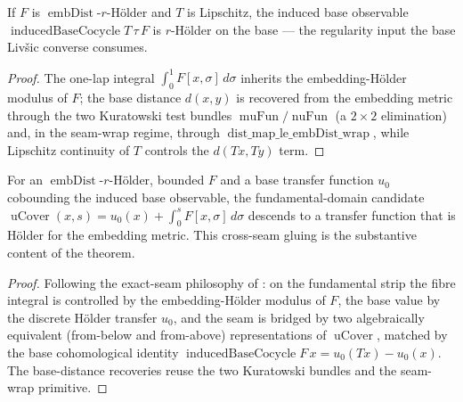 \begin{lemma}\label{holderWith_inducedBaseCocycle}
  \leanok
  If \(F\) is \(\operatorname{embDist}\)-\(r\)-Hölder and \(T\) is Lipschitz, the induced base
  observable \(\operatorname{inducedBaseCocycle} T\,\tau\,F\) is \(r\)-Hölder on the base --- the
  regularity input the base Livšic converse consumes.
\end{lemma}
\begin{proof}\leanok
  The one-lap integral \(\int_0^{1} F[x, \sigma]\,d\sigma\) inherits the embedding-Hölder modulus of
  \(F\); the base distance \(d(x, y)\) is recovered from the embedding metric through the two
  Kuratowski test bundles \(\operatorname{muFun}/\operatorname{nuFun}\) (a \(2\times 2\) elimination)
  and, in the seam-wrap regime, through \(\operatorname{dist\_map\_le\_embDist\_wrap}\), while
  Lipschitz continuity of \(T\) controls the \(d(Tx, Ty)\) term.
\end{proof}

\begin{theorem}\label{holderWith_suspTransfer}
  \leanok
  For an \(\operatorname{embDist}\)-\(r\)-Hölder, bounded \(F\) and a base transfer function \(u_0\)
  cobounding the induced base observable, the fundamental-domain candidate
  \(\operatorname{uCover}(x, s) = u_0(x) + \int_0^{s} F[x, \sigma]\,d\sigma\) descends to a transfer
  function that is Hölder for the embedding metric. This cross-seam gluing is the substantive content
  of the theorem.
\end{theorem}
\begin{proof}\leanok
  Following the exact-seam philosophy of : on the fundamental strip the fibre
  integral is controlled by the embedding-Hölder modulus of \(F\), the base value by the discrete
  Hölder transfer \(u_0\), and the seam is bridged by two algebraically equivalent (from-below and
  from-above) representations of \(\operatorname{uCover}\), matched by the base cohomological identity
  \(\operatorname{inducedBaseCocycle} F\,x = u_0(Tx) - u_0(x)\). The base-distance recoveries reuse
  the two Kuratowski bundles and the seam-wrap primitive.
\end{proof}

